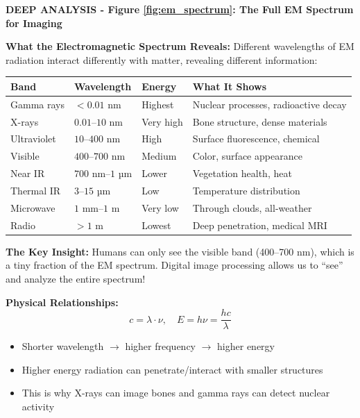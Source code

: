 \documentclass[12pt,a4paper]{article}
\begin{document}
\begin{deepexplanation}
\textbf{DEEP ANALYSIS - Figure \ref{fig:em_spectrum}: The Full EM Spectrum for Imaging}

\textbf{What the Electromagnetic Spectrum Reveals:}
Different wavelengths of EM radiation interact differently with matter, revealing different information:

\begin{center}
\begin{tabular}{|l|l|l|l|}
\hline
\textbf{Band} & \textbf{Wavelength} & \textbf{Energy} & \textbf{What It Shows} \\
\hline
Gamma rays & $< 0.01$ nm & Highest & Nuclear processes, radioactive decay \\
X-rays & $0.01$--$10$ nm & Very high & Bone structure, dense materials \\
Ultraviolet & $10$--$400$ nm & High & Surface fluorescence, chemical \\
Visible & $400$--$700$ nm & Medium & Color, surface appearance \\
Near IR & $700$ nm--$1$ µm & Lower & Vegetation health, heat \\
Thermal IR & $3$--$15$ µm & Low & Temperature distribution \\
Microwave & $1$ mm--$1$ m & Very low & Through clouds, all-weather \\
Radio & $> 1$ m & Lowest & Deep penetration, medical MRI \\
\hline
\end{tabular}
\end{center}

\textbf{The Key Insight:}
Humans can only see the visible band (400--700 nm), which is a tiny fraction of the EM spectrum. Digital image processing allows us to ``see'' and analyze the entire spectrum!

\textbf{Physical Relationships:}
\[
c = \lambda \cdot \nu, \quad E = h\nu = \frac{hc}{\lambda}
\]
\begin{itemize}
    \item Shorter wavelength $\rightarrow$ higher frequency $\rightarrow$ higher energy
    \item Higher energy radiation can penetrate/interact with smaller structures
    \item This is why X-rays can image bones and gamma rays can detect nuclear activity
\end{itemize}
\end{deepexplanation}
\end{document}
